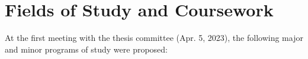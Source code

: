 \documentclass[12pt,vi,oneside,table]{report}
\begin{document}
%
%
%
%
%
%
%


    \section{Fields of Study and Coursework}

    At the first meeting with the thesis committee (Apr. 5, 2023), the following major and minor programs of study were proposed:
\end{document}
